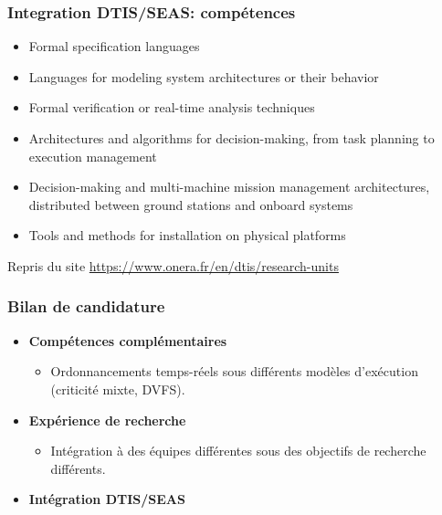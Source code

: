 \documentclass[xcolor=table]{beamer}
\begin{document}
\begin{frame}
	\frametitle{Integration DTIS/SEAS: compétences}
		
	\begin{displayquote}
		\begin{itemize}
			\item \textcolor[rgb]{0.2,0.5,0.2}{Formal specification languages}
			\item \textcolor[rgb]{0.2,0.5,0.2}{Languages for modeling system architectures or their behavior}
			\item \textcolor[rgb]{0.2,0.5,0.2}{Formal verification} or \textcolor[rgb]{0.2,0.5,0.2}{real-time 
			analysis techniques}
			\item Architectures and algorithms for decision-making, from task planning to execution management
			\item Decision-making and multi-machine mission management architectures, distributed between 
			ground stations and onboard systems
			\item \textcolor[rgb]{0.2,0.5,0.2}{Tools and methods for installation on physical platforms}
		\end{itemize}
	\end{displayquote}

	Repris du site \url{https://www.onera.fr/en/dtis/research-units}
	
\end{frame}

\begin{frame}
	\frametitle{Bilan de candidature}
	
	\begin{itemize}
		\item \textbf{Compétences complémentaires}
		\begin{itemize}
			\item Ordonnancements temps-réels sous différents modèles d'exécution (criticité mixte, 
			DVFS).
		\end{itemize}
		\item \textbf{Expérience de recherche}
		\begin{itemize}
			\item Intégration à des équipes différentes sous des objectifs de recherche différents.
		\end{itemize}
		\item \textbf{Intégration DTIS/SEAS}
	\end{itemize}
\end{frame}
\end{document}
